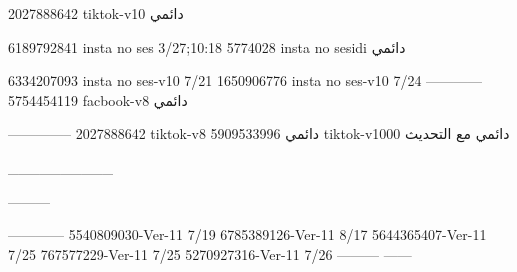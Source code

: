 2027888642 tiktok-v10
دائمي

6189792841 insta no ses
3/27;10:18
5774028 insta no sesidi
دائمي

6334207093 insta no ses-v10
7/21
1650906776 insta no ses-v10
7/24
------------
5754454119 facbook-v8
دائمي


--------------
2027888642 tiktok-v8
دائمي
5909533996 tiktok-v1000
دائمي مع التحديث

__________

---------

------------
5540809030-Ver-11
7/19
6785389126-Ver-11
8/17
5644365407-Ver-11
7/25
767577229-Ver-11
7/25
5270927316-Ver-11
7/26
---------
------
